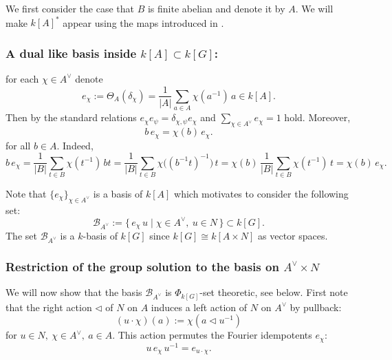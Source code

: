 \documentclass[a4paper,10pt]{amsart}
\theoremstyle{definition}
\theoremstyle{remark}
\begin{document}
We first consider the case that $B$ is finite abelian and denote it by $A$. We will make $k[A]^*$ appear using the maps introduced in .\medskip

\subsubsection{A dual like basis inside $k[A]\subset k[G]$:} for each $\chi \in A^{\vee}$ denote 
$$e_{\chi} := \Theta_A(\delta_{\chi}) = \frac{1}{|A|}\sum_{a\in A}\chi(a^{-1})\,a \in k[A].$$
Then by  the standard relations 
$e_\chi e_\psi=\delta_{\chi, \psi} e_\chi$ and $\sum_{\chi \in A^{\vee}} e_\chi=1$ hold. Moreover,
\begin{equation}\label{eq:trans}
b\,e_\chi=\chi(b)\,e_\chi.
\end{equation}
for all $b\in A$. Indeed, 
\[
b\,e_\chi=\frac{1}{|B|}\sum_{t\in B}\chi(t^{-1})\,bt
=\frac{1}{|B|}\sum_{t\in B}\chi\bigl((b^{-1} t)^{-1}\bigr)\,t
=\chi(b)\,\frac{1}{|B|}\sum_{t\in B}\chi(t^{-1})\,t=\chi(b)\,e_\chi.
\]

\noindent Note that $\{e_\chi\}_{\chi\in A^\vee}$ is a basis of $k[A]$ which motivates to consider the following set:
\[
\mathcal{B}_{A^\vee} := \{\, e_\chi\,u \mid \chi\in A^\vee,\ u\in N\,\}\subset k[G].
\]
\smallskip
The set $\mathcal{B}_{A^\vee}$ is a $k$-basis of $k[G]$ since $k[G]\cong k[A \times N]$ as vector spaces.


\subsubsection{Restriction of the group solution to the basis on $A^{\vee} \times N$}

We will now show that the basis $\mathcal{B}_{A^\vee}$ is $\Phi_{k[G]}$-set theoretic, see  below. First note that the right action $\triangleleft$ of $N$ on $A$ induces a left action of $N$ on $A^\vee$ by pullback:
\begin{equation}\label{eq:dualaction}
(u\cdot\chi)(a):=\chi(a\triangleleft u^{-1})
\end{equation}
for $u\in N,\ \chi\in A^\vee,\ a\in A$. This action permutes the Fourier idempotents $e_{\chi}$:
\begin{equation}\label{eq:conj}
u\,e_\chi\,u^{-1} = e_{u\cdot \chi}.
\end{equation}
\end{document}
